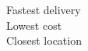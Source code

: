 \documentclass[preview]{standalone}
\begin{document}
Fastest delivery\\Lowest cost\\Closest location\\
\end{document}
